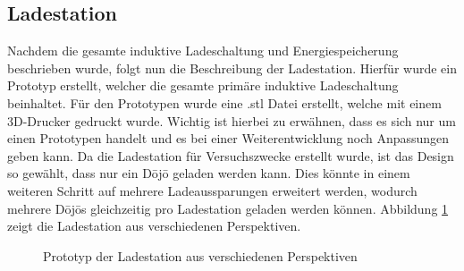 \subsection{Ladestation} \label{sec:ladestation}

Nachdem die gesamte induktive Ladeschaltung und Energiespeicherung beschrieben wurde, folgt nun die Beschreibung der Ladestation. Hierfür wurde ein Prototyp erstellt, welcher die gesamte primäre induktive Ladeschaltung beinhaltet. Für den Prototypen wurde eine .stl Datei erstellt, welche mit einem 3D-Drucker gedruckt wurde. Wichtig ist hierbei zu erwähnen, dass es sich nur um einen Prototypen handelt und es bei einer Weiterentwicklung noch Anpassungen geben kann. Da die Ladestation für Versuchszwecke erstellt wurde, ist das Design so gewählt, dass nur ein Dōjō geladen werden kann. Dies könnte in einem weiteren Schritt auf mehrere Ladeaussparungen erweitert werden, wodurch mehrere Dōjōs gleichzeitig pro Ladestation geladen werden können. Abbildung \ref{fig:Prototyp} zeigt die Ladestation aus verschiedenen Perspektiven.

\begin{figure}[htbp]
	\centering
	\quad
	\quad
	\caption[Prototyp Ladestation]{Prototyp der Ladestation aus verschiedenen Perspektiven}
	\label{fig:Prototyp}
\end{figure}


